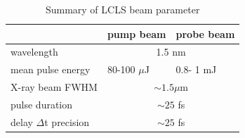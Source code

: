 \begin{table}
	\centering
		\begin{tabular}{ | l | l | l | }
		\hline
			 & pump beam & probe beam  \\ \hline
			wavelength & \multicolumn{2}{|c|}{1.5 nm} \\ \hline
			mean pulse energy & 80-100 $\mu$J & 0.8- 1 mJ \\ \hline
			X-ray beam FWHM & \multicolumn{2}{|c|}{$\sim 1.5 \mu$m} \\ \hline
			pulse duration & \multicolumn{2}{|c|}{$\sim 25$ fs} \\ \hline
			delay $\Delta$t precision & \multicolumn{2}{|c|}{$\sim 25$ fs} \\ \hline
		\end{tabular}
	\caption{Summary of LCLS beam parameter}
	\label{tab:beam-params}
\end{table}
%
%
%
